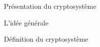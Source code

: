 \begin{section}{Présentation du cryptosystème}
	\begin{subsection}{L'idée générale}
	\end{subsection}
	\begin{subsection}{Définition du cryptosystème}
	\end{subsection}
\end{section}
